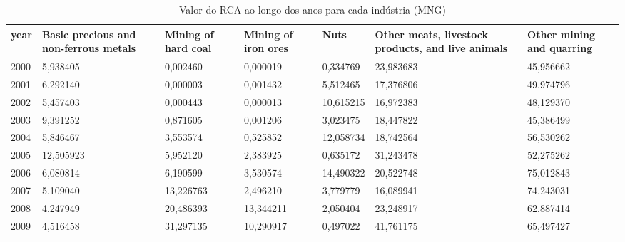 \begin{table}
\centering
\caption{Valor do RCA ao longo dos anos para cada indústria (MNG)}
\begin{tabular}{p{1cm}p{2cm}p{2cm}p{2cm}p{2cm}p{2cm}p{2cm}}
\toprule
 year &  Basic precious and non-ferrous metals &  Mining of hard coal &  Mining of iron ores &      Nuts &  Other meats, livestock products, and live animals &  Other mining and quarring \\
\midrule
 2000 &                               5,938405 &             0,002460 &             0,000019 &  0,334769 &                                          23,983683 &                  45,956662 \\
 2001 &                               6,292140 &             0,000003 &             0,001432 &  5,512465 &                                          17,376806 &                  49,974796 \\
 2002 &                               5,457403 &             0,000443 &             0,000013 & 10,615215 &                                          16,972383 &                  48,129370 \\
 2003 &                               9,391252 &             0,871605 &             0,001206 &  3,023475 &                                          18,447822 &                  45,386499 \\
 2004 &                               5,846467 &             3,553574 &             0,525852 & 12,058734 &                                          18,742564 &                  56,530262 \\
 2005 &                              12,505923 &             5,952120 &             2,383925 &  0,635172 &                                          31,243478 &                  52,275262 \\
 2006 &                               6,080814 &             6,190599 &             3,530574 & 14,490322 &                                          20,522748 &                  75,012843 \\
 2007 &                               5,109040 &            13,226763 &             2,496210 &  3,779779 &                                          16,089941 &                  74,243031 \\
 2008 &                               4,247949 &            20,486393 &            13,344211 &  2,050404 &                                          23,248917 &                  62,887414 \\
 2009 &                               4,516458 &            31,297135 &            10,290917 &  0,497022 &                                          41,761175 &                  65,497427 \\

\end{tabular}
\end{table}
